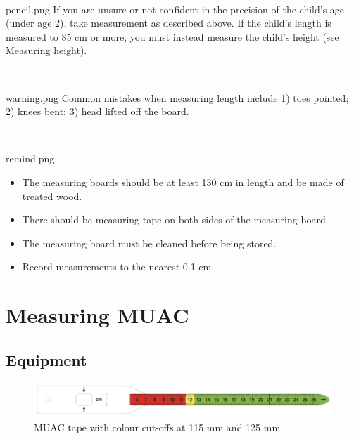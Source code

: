 \documentclass[
  12pt,
]{book}
\newenvironment{rmdremind}
  {\begin{tcolorbox}[width=\textwidth, 
                     colback = {white}, 
                     title = {\textbf{Remember}}, 
                     colbacktitle = lightgray,
                     coltitle = black]
  \begin{includegraphics}[scale = 1]{remind.png}
  \begin{itemize}}
  {\end{itemize}
  \end{includegraphics}
  \end{tcolorbox}}
\newenvironment{rmdnote}
  {\begin{tcolorbox}[width=\textwidth, 
                     colback = {white}, 
                     title = {\textbf{Note}}, 
                     colbacktitle = lightgray,
                     coltitle = black]
  \begin{includegraphics}[scale = 1]{pencil.png}}
  {\end{includegraphics}
  \end{tcolorbox}}
\newenvironment{rmdwarning}
  {\begin{tcolorbox}[width=\textwidth, 
                     colback = {white}, 
                     title = {\textbf{Warning}}, 
                     colbacktitle = lightgray,
                     coltitle = black]
  \begin{includegraphics}[scale = 1]{warning.png}}
  {\end{includegraphics}
  \end{tcolorbox}}
\begin{document}
~

\begin{rmdnote}
If you are unsure or not confident in the precision of the child's age (under age 2), take measurement as described above. If the child's length is measured to 85 cm or more, you must instead measure the child's height (see \protect\hyperlink{measuring-height}{Measuring height}).
\end{rmdnote}

~

\begin{rmdwarning}
Common mistakes when measuring length include 1) toes pointed; 2) knees bent; 3) head lifted off the board.
\end{rmdwarning}

~

\begin{rmdremind}
\item

The measuring boards should be at least 130 cm in length and be made of treated wood.

\item

There should be measuring tape on both sides of the measuring board.

\item

The measuring board must be cleaned before being stored.

\item

Record measurements to the nearest 0.1 cm.
\end{rmdremind}

\hypertarget{muac}{%
\chapter{Measuring MUAC}\label{muac}}

\hypertarget{equipment-2}{%
\section{Equipment}\label{equipment-2}}

\begin{figure}

{\centering \includegraphics[width=13.11in]{images/muac01} 

}

\caption{MUAC tape with colour cut-offs at 115 mm and 125 mm}\label{fig:muac1}
\end{figure}
\end{document}
